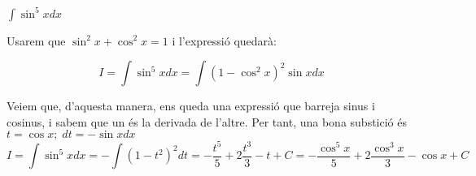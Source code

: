 \Exercise[title={$\int \sin^m x \cos^n x dx$ amb \(m , n \in Z^+\) i $m$ o $n$ senar}]


$\int \sin^5{x}dx$ 


\Answer

  Usarem que $\sin^2{x}+\cos^2{x}=1$ i l'expressió quedarà:

  \[
    I=\int \sin^5{x}dx = \int \left(1-\cos^2{x}\right)^2\sin{x}dx
  \]

  Veiem que, d'aquesta manera, ens queda una expressió que barreja sinus i cosinus, i sabem que un és la derivada de l'altre. Per tant, una bona substició és $t=\cos{x}; \; dt=-\sin{x}dx$
  \[
    I=\int \sin^5{x}dx = - \int \left(1-t^2\right)^2dt=-\frac{t^5}{5}+2 \frac{t^3}{3}-t+C= -\frac{\cos^5{x}}{5}+2 \frac{\cos^3{x}}{3}-\cos{x}+C
  \]


